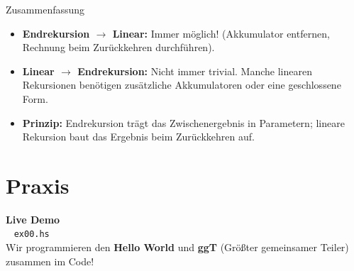 \documentclass[aspectratio=169,11pt]{beamer}
\begin{document}
\begin{frame}{Zusammenfassung}
    \begin{tcolorbox}[modernbox, title=\faListUl\ Wichtige Erkenntnisse]
        \begin{itemize}
            \item \textbf{Endrekursion $\rightarrow$ Linear:} Immer möglich! (Akkumulator entfernen, Rechnung beim Zurückkehren durchführen).
            \item \textbf{Linear $\rightarrow$ Endrekursion:} Nicht immer trivial. Manche linearen Rekursionen benötigen zusätzliche Akkumulatoren oder eine geschlossene Form.
            \item \textbf{Prinzip:} Endrekursion trägt das Zwischenergebnis in Parametern; lineare Rekursion baut das Ergebnis beim Zurückkehren auf.
        \end{itemize}
    \end{tcolorbox}
\end{frame}

\section{Praxis}

\begin{frame}[plain]
    \begin{center}
        \Huge \textbf{Live Demo} \\
        \vspace{0.5cm}
        \large \faLaptopCode~ \texttt{ex00.hs} \\
        \vspace{0.3cm}
        \normalsize Wir programmieren den \textbf{Hello World} und \textbf{ggT} (Größter gemeinsamer Teiler) zusammen im Code!
    \end{center}
\end{frame}
\end{document}
